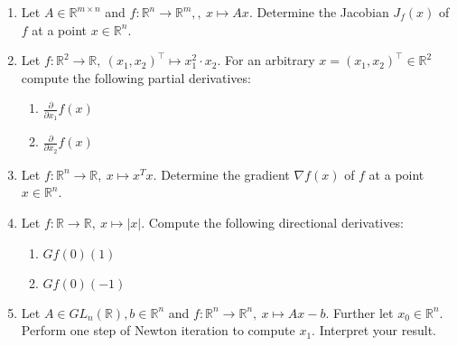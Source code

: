 \begin{enumerate}
	\item Let $A\in \mathbb{R}^{m \times n}$ and $f : \mathbb{R}^{n} \to \mathbb{R}^m,, ~x \mapsto Ax $. Determine the Jacobian $J_f(x)$ of $f$ at a point $x \in\mathbb{R}^{n}$.
	\item Let $f\colon \mathbb{R}^2 \to \mathbb{R},~(x_1,x_2)^\top \mapsto x_1^2 \cdot x_2$. For an arbitrary $x=(x_1,x_2)^\top \in \mathbb{R}^2$ compute the following partial derivatives:
	\begin{enumerate}
		\item $\frac{\partial}{\partial x_1} f(x)$
		\item $\frac{\partial}{\partial x_2} f(x)$
	\end{enumerate}
	\item Let $f : \mathbb{R}^{n} \to \mathbb{R},~ x \mapsto x^T  x $. Determine the gradient $\nabla f(x)$ of $f$ at a point $x \in\mathbb{R}^{n}$.
	\item Let $f\colon \mathbb{R} \to \mathbb{R},~x\mapsto |x|$. Compute the following directional derivatives:
	\begin{enumerate}
		\item $Gf(0)(1)$
		\item $Gf(0)(-1)$
	\end{enumerate}
	\item Let $A\in GL_n(\mathbb{R}), b \in \mathbb{R}^n$ and $f : \mathbb{R}^{n} \to \mathbb{R}^n, ~x \mapsto Ax -b $. Further let $x_0 \in \mathbb{R}^n$. Perform one step of Newton iteration to compute $x_1$. Interpret your result.
\end{enumerate}
 
